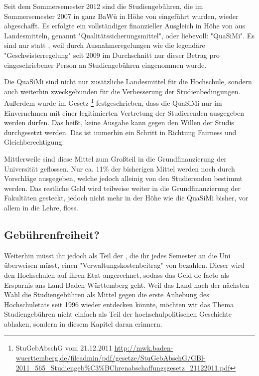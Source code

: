 %

\newpage
{}%
Seit dem Sommersemester 2012 sind die Studiengebühren, die im Sommersemester
2007 in ganz BaWü in Höhe von  eingeführt wurden, wieder abgeschafft.
Es erfolgte ein vollständiger finanzieller Ausgleich in Höhe von  aus
Landesmitteln, genannt "Qualitätssicherungsmittel", oder liebevoll: "QuaSiMi".
Es sind nur  statt , weil durch Ausnahmeregelungen wie die
legendäre "Geschwisterregelung" seit 2009 im Durchschnitt nur dieser Betrag pro
eingeschriebener Person an Studiengebühren eingenommen wurde.

Die QuaSiMi sind nicht nur zusätzliche Landesmittel für die Hochschule, sondern
auch weiterhin zweckgebunden für die Verbesserung der Studienbedingungen.
Außerdem wurde im Gesetz \footnote{StuGebAbschG vom 21.12.2011
\url{http://mwk.baden-wuerttemberg.de/fileadmin/pdf/gesetze/StuGebAbschG/GBl-2011_565_Studiengeb\%C3\%BChrenabschaffungsgesetz_21122011.pdf}}
festgeschrieben, dass die QuaSiMi nur im Einvernehmen mit einer legitimierten
Vertretung der Studierenden ausgegeben werden dürfen. Das heißt, keine Ausgabe
kann gegen den Willen der Studis durchgesetzt werden. Das ist immerhin ein
Schritt in Richtung Fairness und Gleichberechtigung.

Mittlerweile sind diese Mittel zum Großteil in die Grundfinanzierung der
Universität geflossen. Nur ca. 11\% der bisherigen Mittel werden noch durch
Vorschläge ausgegeben, welche jedoch alleinig von den Studierenden bestimmt
werden. Das restliche Geld wird teilweise weiter in die Grundfinanzierung der
Fakultäten gesteckt, jedoch nicht mehr in der Höhe wie die QuaSiMi bisher,
vor allem in die Lehre, floss.

\subsection*{Gebührenfreiheit?}
Weiterhin müsst ihr jedoch als Teil der \EUR{\beitragssumme}, die ihr jedes
Semester an die Uni überweisen müsst, einen "Verwaltungskostenbeitrag" von
\EUR{\verwaltungsbetrag} bezahlen. Dieser wird den Hochschulen auf ihren Etat
angerechnet, sodass das Geld de facto als Ersparnis ans Land Baden-Württemberg
geht. Weil das Land nach der nächsten Wahl die Studiengebühren als Mittel gegen
die erste Anhebung des Hochschuletats seit 1996 wieder entdecken könnte, möchten
wir das Thema Studiengebühren nicht einfach als Teil der hochschulpolitischen
Geschichte abhaken, sondern in diesem Kapitel daran erinnern.
\iffalse
Wir laden Euch darüber hinaus ein, Euch über die Hintergründe der
Studiengebühren zu informieren, beispielsweise auf unserer Fachschaftshomepage
\footnote{http://mathphys.fsk.uni-heidelberg.de/studgeb-historie.html}.
\fi
%

